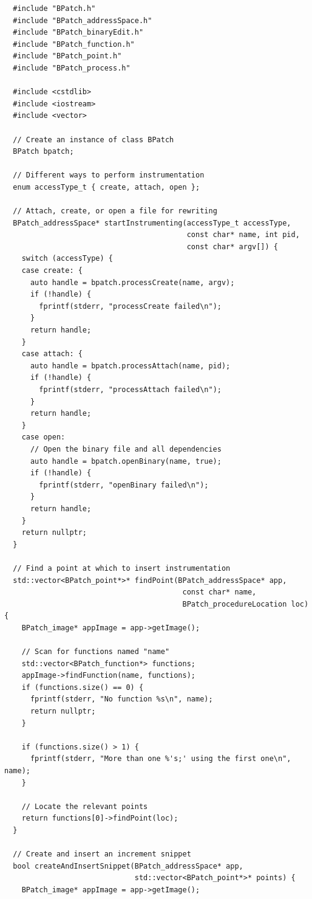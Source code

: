 \begin{lstlisting}
  #include "BPatch.h"
  #include "BPatch_addressSpace.h"
  #include "BPatch_binaryEdit.h"
  #include "BPatch_function.h"
  #include "BPatch_point.h"
  #include "BPatch_process.h"

  #include <cstdlib>
  #include <iostream>
  #include <vector>

  // Create an instance of class BPatch
  BPatch bpatch;

  // Different ways to perform instrumentation
  enum accessType_t { create, attach, open };

  // Attach, create, or open a file for rewriting
  BPatch_addressSpace* startInstrumenting(accessType_t accessType,
                                          const char* name, int pid,
                                          const char* argv[]) {
    switch (accessType) {
    case create: {
      auto handle = bpatch.processCreate(name, argv);
      if (!handle) {
        fprintf(stderr, "processCreate failed\n");
      }
      return handle;
    }
    case attach: {
      auto handle = bpatch.processAttach(name, pid);
      if (!handle) {
        fprintf(stderr, "processAttach failed\n");
      }
      return handle;
    }
    case open:
      // Open the binary file and all dependencies
      auto handle = bpatch.openBinary(name, true);
      if (!handle) {
        fprintf(stderr, "openBinary failed\n");
      }
      return handle;
    }
    return nullptr;
  }

  // Find a point at which to insert instrumentation
  std::vector<BPatch_point*>* findPoint(BPatch_addressSpace* app,
                                         const char* name,
                                         BPatch_procedureLocation loc) {
    BPatch_image* appImage = app->getImage();

    // Scan for functions named "name"
    std::vector<BPatch_function*> functions;
    appImage->findFunction(name, functions);
    if (functions.size() == 0) {
      fprintf(stderr, "No function %s\n", name);
      return nullptr;
    }

    if (functions.size() > 1) {
      fprintf(stderr, "More than one %'s;' using the first one\n", name);
    }

    // Locate the relevant points
    return functions[0]->findPoint(loc);
  }

  // Create and insert an increment snippet
  bool createAndInsertSnippet(BPatch_addressSpace* app,
                              std::vector<BPatch_point*>* points) {
    BPatch_image* appImage = app->getImage();


\end{lstlisting}

